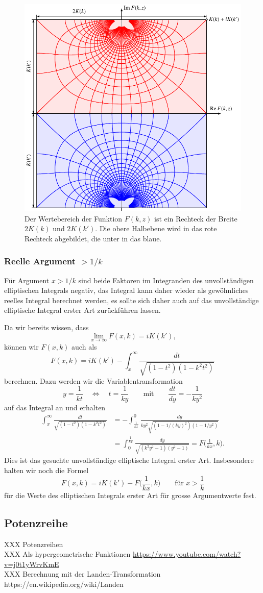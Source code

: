 \begin{figure}
\centering
\includegraphics{chapters/110-elliptisch/images/rechteck.pdf}
\caption{Der Wertebereich der Funktion $F(k,z)$ ist ein Rechteck
der Breite $2K(k)$ und $2K(k')$.
Die obere Halbebene wird in das rote Rechteck abgebildet, die unter
in das blaue.
\label{buch:elliptisch:fig:rechteck}}
\end{figure}

\subsubsection{Reelle Argument $> 1/k$}
Für Argument $x> 1/k$ sind beide Faktoren im Integranden des 
unvollständigen elliptischen Integrals negativ, das Integral kann
daher wieder als gewöhnliches reelles Integral berechnet werden,
es sollte sich daher auch auf das unvollständige elliptische Integral
erster Art zurückführen lassen.

Da wir bereits wissen, dass 
\[
\lim_{x\to\infty} F(x,k) = iK(k'),
\]
können wir $F(x,k)$ auch als
\[
F(x,k)
=
iK(k')
-
\int_x^\infty \frac{dt}{\sqrt{(1-t^2)(1-k^2t^2)}}
\]
berechnen.
Dazu werden wir die Variablentransformation
\[
y=\frac{1}{kt}\quad\Leftrightarrow\quad t=\frac{1}{ky}
\qquad\text{mit}\qquad
\frac{dt}{dy} = -\frac{1}{ky^2}
\]
auf das Integral an und erhalten
\begin{align*}
\int_x^\infty \frac{dt}{\sqrt{(1-t^2)(1-k^2t^2)}}
&=
-\int_{\frac1{kx}}^0 \frac{dy}{ky^2\sqrt{(1-1/(ky)^2)(1-1/y^2)}}
\\
&=
\int_0^{\frac{1}{kx}} \frac{dy}{\sqrt{(k^2y^2-1)(y^2-1)}}
=
F\biggl(\frac{1}{kx},k\biggr).
\end{align*}
Dies ist das gesuchte unvollständige elliptische Integral erster Art.
Insbesondere halten wir noch die Formel
\[
F(x,k) = iK(k') - F\biggl(\frac1{kx},k\biggr)
\qquad\text{für $x>\frac1k$}
\]
für die Werte des elliptischen Integrals erster Art für grosse Argumentwerte
fest.

\subsection{Potenzreihe}
XXX Potenzreihen \\
XXX Als hypergeometrische Funktionen \url{https://www.youtube.com/watch?v=j0t1yWrvKmE} \\
XXX Berechnung mit der Landen-Transformation https://en.wikipedia.org/wiki/Landen%
